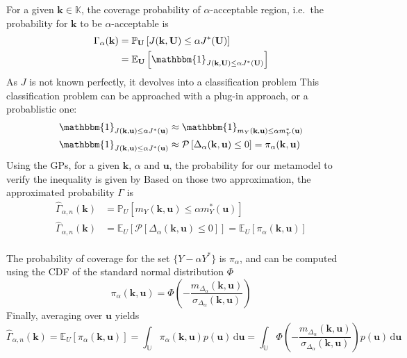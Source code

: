 \documentclass[a4paper,11pt]{article}
\newcommand{\Ex}{\mathbb{E}}
\newcommand{\Prob}{\mathbb{P}}
\newcommand{\ProbGP}{\mathcal{P}}
\newcommand{\Kspace}{\mathbb{K}}
\newcommand{\Uspace}{\mathbb{U}}
\theoremstyle{defi}
\numberwithin{thmCounter}{section}
\begin{document}
For a given $\mathbf{k}\in\Kspace$, the coverage probability of $\alpha$-acceptable region, i.e.\ the probability for $\mathbf{k}$ to be $\alpha$-acceptable is
\begin{align}
  \Gamma_{\alpha}(\mathbf{k}) &= \Prob_{\mathbf{U}}\left[J(\mathbf{k},\mathbf{U}) \leq \alpha J^*(\mathbf{U})\right] \\
                              & =\Ex_{\mathbf{U}}\left[\mathbbm{1}_{J(\mathbf{k},\mathbf{U}) \leq \alpha J^*(\mathbf{U})}\right]
\end{align}
As $J$ is not known perfectly, it devolves into a classification problem
This classification problem can be approached with a plug-in approach, or a probablistic one:
\begin{align}
  \mathbbm{1}_{J(\mathbf{k},\mathbf{u}) \leq \alpha J^*(\mathbf{u})} &\approx   \mathbbm{1}_{m_Y(\mathbf{k},\mathbf{u}) \leq \alpha m_Y^*(\mathbf{u})} \\
  \mathbbm{1}_{J(\mathbf{k},\mathbf{u}) \leq \alpha J^*(\mathbf{u})} &\approx   \ProbGP\left[ \Delta_{\alpha}(\mathbf{k},\mathbf{u}) \leq 0 \right] = \pi_{\alpha}(\mathbf{k},\mathbf{u})
\end{align}
Using the GPs, for a given $\mathbf{k}$, $\alpha$ and $\mathbf{u}$, the probability for our metamodel to verify the inequality is given by
Based on those two approximation, the approximated probability $\Gamma$ is
\begin{align}
  \hat{\Gamma}_{\alpha, n}(\mathbf{k}) &= \Prob_U\left[m_Y(\mathbf{k},\mathbf{u}) \leq \alpha m_Y^*(\mathbf{u}) \right] \tag{plug-in} \\
  \hat{\Gamma}_{\alpha, n}(\mathbf{k}) &= \Ex_U\left[ \ProbGP\left[ \Delta_{\alpha}(\mathbf{k},\mathbf{u}) \leq 0\right]\right]  = \Ex_U\left[\pi_{\alpha}(\mathbf{k},\mathbf{u})\right]\tag{Probabilistic approx} \\
\end{align}

The probability of coverage for the set $\{Y - \alpha Y^*\}$ is $\pi_{\alpha}$, and can be computed using the CDF of the standard normal distribution $\Phi$
\begin{equation}
  \pi_{\alpha}(\mathbf{k},\mathbf{u}) = \Phi\left(-\frac{m_{\Delta_\alpha}(\mathbf{k},\mathbf{u})}{\sigma_{\Delta_\alpha}(\mathbf{k},\mathbf{u})}\right)
\end{equation}
Finally, averaging over $\mathbf{u}$ yields
\begin{equation}
  \hat{\Gamma}_{\alpha,n}(\mathbf{k}) = \Ex_U\left[\pi_{\alpha}(\mathbf{k},\mathbf{u})\right]=\int_{\Uspace}\pi_{\alpha}(\mathbf{k},\mathbf{u})p(\mathbf{u}) \,\mathrm{d}\mathbf{u} = \int_{\Uspace}\Phi\left(-\frac{m_{\Delta_\alpha}(\mathbf{k},\mathbf{u})}{\sigma_{\Delta_\alpha}(\mathbf{k},\mathbf{u})}\right)p(\mathbf{u}) \,\mathrm{d}\mathbf{u}
\end{equation}
\end{document}
